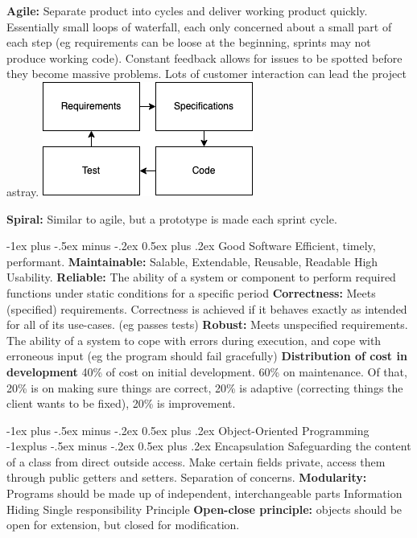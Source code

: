 \documentclass[letterpaper, 8pt]{extarticle}
\makeatletter
\renewcommand{\section}{\@startsection{section}{1}{0mm}%
                                {-1ex plus -.5ex minus -.2ex}%
                                {0.5ex plus .2ex}%
                                {\normalfont\normalsize\bfseries}}
\renewcommand{\subsection}{\@startsection{subsection}{2}{0mm}%
                                {-1explus -.5ex minus -.2ex}%
                                {0.5ex plus .2ex}%
                                {\normalfont\small\bfseries}}
\makeatother
\begin{document}
\begin{multicols*}{6}
    \textbf{Agile:} Separate product into cycles
    and deliver working product quickly.
    Essentially small loops of waterfall,
    each only concerned about a small part of each step
    (eg requirements can be loose at the beginning, sprints may not produce working code).
    Constant feedback allows for issues to be spotted before they become massive problems.
    Lots of customer interaction can lead the project astray.
    \includegraphics[width=0.8\linewidth]{agile.png}

    \textbf{Spiral:} Similar to agile, but a prototype is made each sprint cycle.

    \section{Good Software}
    Efficient, timely, performant.
    \textbf{Maintainable:} Salable, Extendable, Reusable, Readable
    High Usability.
    \textbf{Reliable:} The ability of a system or component to perform
    required functions under static conditions for a specific period
    \textbf{Correctness:} Meets (specified) requirements.
    Correctness is achieved if it behaves exactly as intended
    for all of its use-cases. (eg passes tests)
    \textbf{Robust:} Meets unspecified requirements.
    The ability of a system to cope with errors during execution,
    and cope with erroneous input (eg the program should fail gracefully)
    \textbf{Distribution of cost in development}
    40\% of cost on initial development. 60\% on maintenance.
    Of that, 20\% is on making sure things are correct,
    20\% is adaptive (correcting things the client wants to be fixed),
    20\% is improvement.

    \section{Object-Oriented Programming}
    \subsection{Encapsulation}
    Safeguarding the content of a class from direct outside access.
    Make certain fields private, access them through public getters and setters.
    Separation of concerns.
    \textbf{Modularity:} Programs should be made up of independent, interchangeable parts
    Information Hiding
    Single responsibility Principle
    \textbf{Open-close principle:} objects should be open for extension,
    but closed for modification.


\end{multicols*}
\end{document}
